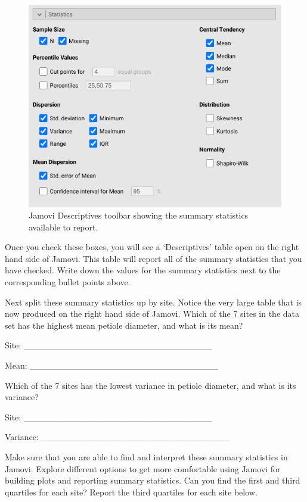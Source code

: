 \documentclass[
]{scrbook}
\begin{document}
\begin{figure}
\includegraphics[width=1\linewidth]{img/lilypad_summary_statistics} \caption{Jamovi Descriptives toolbar showing the summary statistics available to report.}\label{fig:unnamed-chunk-52}
\end{figure}

Once you check these boxes, you will see a `Descriptives' table open on the right hand side of Jamovi.
This table will report all of the summary statistics that you have checked.
Write down the values for the summary statistics next to the corresponding bullet points above.

Next split these summary statistics up by site.
Notice the very large table that is now produced on the right hand side of Jamovi.
Which of the 7 sites in the data set has the highest mean petiole diameter, and what is its mean?

Site: \_\_\_\_\_\_\_\_\_\_\_\_\_\_\_\_\_\_\_\_\_\_\_\_\_\_\_\_\_\_

Mean: \_\_\_\_\_\_\_\_\_\_\_\_\_\_\_\_\_\_\_\_\_\_\_\_\_\_\_\_\_\_

Which of the 7 sites has the lowest variance in petiole diameter, and what is its variance?

Site: \_\_\_\_\_\_\_\_\_\_\_\_\_\_\_\_\_\_\_\_\_\_\_\_\_\_\_\_\_\_

Variance: \_\_\_\_\_\_\_\_\_\_\_\_\_\_\_\_\_\_\_\_\_\_\_\_\_\_\_\_\_\_

Make sure that you are able to find and interpret these summary statistics in Jamovi.
Explore different options to get more comfortable using Jamovi for building plots and reporting summary statistics.
Can you find the first and third quartiles for each site?
Report the third quartiles for each site below.
\end{document}
